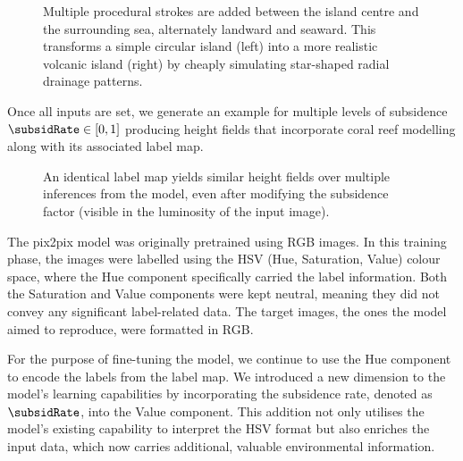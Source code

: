 \begin{figure}
    \caption{Multiple procedural strokes are added between the island centre and the surrounding sea, alternately landward and seaward. This transforms a simple circular island (left) into a more realistic volcanic island (right) by cheaply simulating star-shaped radial drainage patterns.}
    \label{fig:coral-island-radial-pattern-example}
\end{figure}

Once all inputs are set, we generate an example for multiple levels of subsidence $\subsidRate \in [0, 1]$ producing height fields that incorporate coral reef modelling along with its associated label map.

\begin{figure}
    \caption{An identical label map yields similar height fields over multiple inferences from the model, even after modifying the subsidence factor (visible in the luminosity of the input image).}
    \label{fig:coral-island-results-subsidence}
\end{figure}

The pix2pix model was originally pretrained using RGB images. In this training phase, the images were labelled using the HSV (Hue, Saturation, Value) colour space, where the Hue component specifically carried the label information. Both the Saturation and Value components were kept neutral, meaning they did not convey any significant label-related data. The target images, the ones the model aimed to reproduce, were formatted in RGB.

For the purpose of fine-tuning the model, we continue to use the Hue component to encode the labels from the label map. We introduced a new dimension to the model's learning capabilities by incorporating the subsidence rate, denoted as $\subsidRate$, into the Value component. This addition not only utilises the model's existing capability to interpret the HSV format but also enriches the input data, which now carries additional, valuable environmental information.


